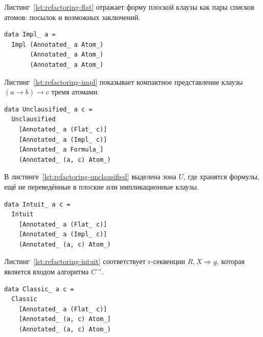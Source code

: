 \documentclass[14pt, russian]{scrartcl}
\begin{document}
Листинг~\ref{lst:refactoring-flat} отражает форму плоской клаузы как пары
списков атомов: посылок и возможных заключений.

\begin{listing}[!htb]
\caption{Тип импликационной клаузы \texttt{Impl\_}}
\label{lst:refactoring-impl}
\begin{verbatim}
data Impl_ a =
  Impl (Annotated_ a Atom_)
       (Annotated_ a Atom_)
       (Annotated_ a Atom_)
\end{verbatim}
\end{listing}

Листинг~\ref{lst:refactoring-impl} показывает компактное представление клаузы
$(a \rightarrow b) \rightarrow c$ тремя атомами.

\begin{listing}[!htb]
\caption{Секвенция фазы клаузификации \texttt{Unclausified\_}}
\label{lst:refactoring-unclausified}
\begin{verbatim}
data Unclausified_ a c =
  Unclausified
    [Annotated_ a (Flat_ c)]
    [Annotated_ a (Impl_ c)]
    [Annotated_ a Formula_]
    (Annotated_ (a, c) Atom_)
\end{verbatim}
\end{listing}

В листинге~\ref{lst:refactoring-unclausified} выделена зона $U$, где хранятся
формулы, ещё не переведённые в плоские или импликационные клаузы.

\begin{listing}[!htb]
\caption{r-секвенция \texttt{Intuit\_}}
\label{lst:refactoring-intuit}
\begin{verbatim}
data Intuit_ a c =
  Intuit
    [Annotated_ a (Flat_ c)]
    [Annotated_ a (Impl_ c)]
    (Annotated_ (a, c) Atom_)
\end{verbatim}
\end{listing}

Листинг~\ref{lst:refactoring-intuit} соответствует r-секвенции
$R, X \Rightarrow g$, которая является входом алгоритма $C^{\rightarrow}$.

\begin{listing}[!htb]
\caption{Классическая секвенция \texttt{Classic\_}}
\label{lst:refactoring-classic}
\begin{verbatim}
data Classic_ a c =
  Classic
    [Annotated_ a (Flat_ c)]
    [Annotated_ (a, c) Atom_]
    (Annotated_ (a, c) Atom_)
\end{verbatim}
\end{listing}
\end{document}

